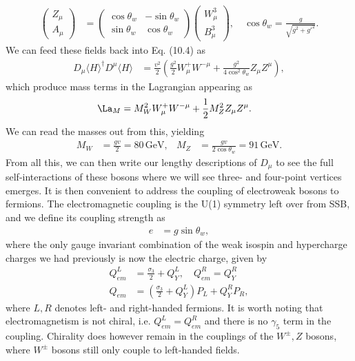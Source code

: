 \documentclass[a4paper, 11pt, normalem]{report}
\begin{document}
\begin{align}
    \begin{pmatrix} Z_\mu \\ A_\mu \end{pmatrix} &= \begin{pmatrix} \cos\theta_w & -\sin\theta_w \\ \sin\theta_w & \cos\theta_w\end{pmatrix}\begin{pmatrix} W_\mu^3 \\ B_\mu^3\end{pmatrix}, \quad \cos\theta_w = \frac{g}{\sqrt{g^2+g'^2}}.
\end{align}
We can feed these fields back into Eq. (10.4) as
\begin{align}
    D_\mu\langle H\rangle^\dagger D^\mu\langle H\rangle &= \frac{v^2}{2}\left(\frac{g^2}{2}W_\mu^+W^{-\mu} + \frac{g^2}{4\cos^2\theta_w}Z_\mu Z^\mu\right),
\end{align}
which produce mass terms in the Lagrangian appearing as
\begin{align}
    \La_M &= M_W^2W_\mu^+ W^{-\mu} + \frac12 M_Z^2 Z_\mu Z^\mu.
\end{align}
We can read the masses out from this, yielding
\begin{align}
    M_W &= \frac{gv}{2} = 80\,\text{GeV}, & M_Z &= \frac{gv}{2\cos\theta_w} = 91\,\text{GeV}.
\end{align}
From all this, we can then write our lengthy descriptions of $D_\mu$ to see the full self-interactions of these bosons where we will see three- and four-point vertices emerges.
It is then convenient to address the coupling of electroweak bosons to fermions.
The electromagnetic coupling is the U(1) symmetry left over from SSB, and we define its coupling strength as
\begin{align}
    e &= g\sin\theta_w,
\end{align}
where the only gauge invariant combination of the weak isospin and hypercharge charges we had previously is now the electric charge, given by
\begin{align}
    Q^L_{em} &= \frac{\sigma_3}{2} + Q^L_Y,\quad Q_{em}^R = Q_Y^R \\
    Q_{em} &= \left(\frac{\sigma_3}{2}+Q_Y^L\right)P_L + Q_Y^RP_R,
\end{align}
where $L,R$ denotes left- and right-handed fermions.
It is worth noting that electromagnetism is not chiral, i.e. $Q_{em}^L = Q^R_{em}$ and there is no $\gamma_5$ term in the coupling.
Chirality does however remain in the couplings of the $W^\pm,Z$ bosons, where $W^\pm$ bosons still only couple to left-handed fields.
\end{document}
